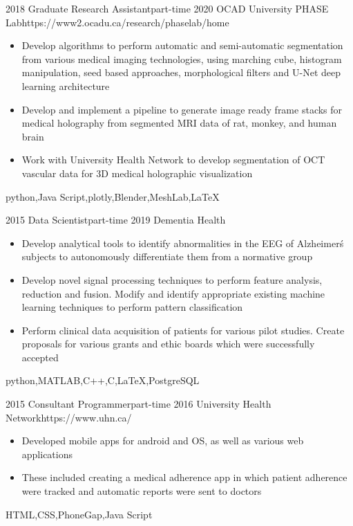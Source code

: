 \begin{experiences}
	\myExperience
	{2018}       {Graduate Research Assistant}{part-time}
	{2020}      {OCAD University PHASE Lab}{https://www2.ocadu.ca/research/phaselab/home}
	{
		\begin{itemize}
			\item Develop algorithms to perform automatic and semi-automatic segmentation from various medical imaging technologies, using marching cube, histogram manipulation, seed based approaches, morphological filters and U-Net deep learning architecture
			\item Develop and implement a pipeline to generate image ready frame stacks for medical holography from segmented MRI data of rat, monkey, and human brain
			\item Work with University Health Network to develop segmentation of OCT vascular data for 3D medical holographic visualization
		\end{itemize}
	}
	{python,Java Script,plotly,Blender,MeshLab,\LaTeX}
	
	\emptySeparator	
	
	\myExperience
	{2015}       {Data Scientist}{part-time}
	{2019}      {Dementia Health}{}
	{
		\begin{itemize}
			\item Develop analytical tools to identify abnormalities in the EEG of Alzheimer\'s subjects to autonomously differentiate them from a normative group
			\item  Develop novel signal processing techniques to perform feature analysis, reduction and fusion. Modify and identify appropriate existing machine learning techniques to perform pattern classification
			\item Perform clinical data acquisition of patients for various pilot studies. Create proposals for various grants and ethic boards which were successfully accepted
		\end{itemize}
	}
	{python,MATLAB,C++,C,\LaTeX,PostgreSQL}
	
	\emptySeparator
	
	
	\myExperience
	{2015}       {Consultant Programmer}{part-time}
	{2016}      {University Health Network}{https://www.uhn.ca/}
	{
		\begin{itemize}
			\item Developed mobile apps for android and OS, as well as various web applications
			\item These included creating a medical adherence app in which patient adherence were tracked and automatic reports were sent to doctors
		\end{itemize}
	}
	{HTML,CSS,PhoneGap,Java Script}
	

\end{experiences}
